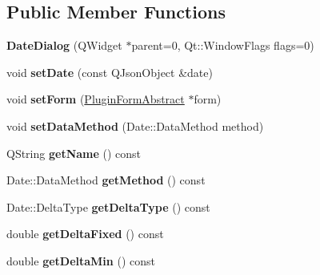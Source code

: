 \subsection*{Public Member Functions}
\begin{DoxyCompactItemize}
\item 
\hypertarget{class_date_dialog_a15732af90546f3bedcfe8e857f039b5f}{{\bfseries Date\-Dialog} (Q\-Widget $\ast$parent=0, Qt\-::\-Window\-Flags flags=0)}\label{class_date_dialog_a15732af90546f3bedcfe8e857f039b5f}

\item 
\hypertarget{class_date_dialog_adf8a9b46d06f73385331de2f08283e7a}{void {\bfseries set\-Date} (const Q\-Json\-Object \&date)}\label{class_date_dialog_adf8a9b46d06f73385331de2f08283e7a}

\item 
\hypertarget{class_date_dialog_a5eff497f3cb55faaceb69176d42c825d}{void {\bfseries set\-Form} (\hyperlink{class_plugin_form_abstract}{Plugin\-Form\-Abstract} $\ast$form)}\label{class_date_dialog_a5eff497f3cb55faaceb69176d42c825d}

\item 
\hypertarget{class_date_dialog_afc2fddef3bc4adc9bfca075d88be4e40}{void {\bfseries set\-Data\-Method} (Date\-::\-Data\-Method method)}\label{class_date_dialog_afc2fddef3bc4adc9bfca075d88be4e40}

\item 
\hypertarget{class_date_dialog_a504a94438590b39ee9df34faa084c9c1}{Q\-String {\bfseries get\-Name} () const }\label{class_date_dialog_a504a94438590b39ee9df34faa084c9c1}

\item 
\hypertarget{class_date_dialog_ab58b2a0eeb6868cfd08e46264b09bc78}{Date\-::\-Data\-Method {\bfseries get\-Method} () const }\label{class_date_dialog_ab58b2a0eeb6868cfd08e46264b09bc78}

\item 
\hypertarget{class_date_dialog_a045b75c4092b5559f176c01f264f7652}{Date\-::\-Delta\-Type {\bfseries get\-Delta\-Type} () const }\label{class_date_dialog_a045b75c4092b5559f176c01f264f7652}

\item 
\hypertarget{class_date_dialog_a59a4bc45c5aa907da45202c88117f0c1}{double {\bfseries get\-Delta\-Fixed} () const }\label{class_date_dialog_a59a4bc45c5aa907da45202c88117f0c1}

\item 
\hypertarget{class_date_dialog_a2ec7d1c994f76e693376c69fbdf45954}{double {\bfseries get\-Delta\-Min} () const }\label{class_date_dialog_a2ec7d1c994f76e693376c69fbdf45954}


\end{DoxyCompactItemize}
